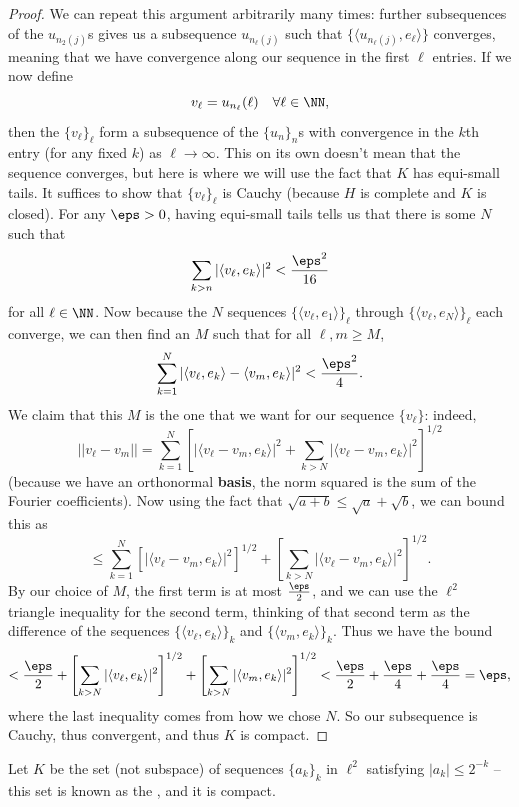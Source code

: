 \begin{proof}
We can repeat this argument arbitrarily many times: further subsequences of the $u_{n_2(j)}$s gives us a subsequence $u_{n_\ell(j)}$ such that $\{\langle u_{n_\ell(j)}, e_\ell \rangle\}$ converges, meaning that we have convergence along our sequence in the first $\ell$ entries. If we now define
\[
    v_\ell = u_{n_\ell}(\ell) \quad \forall \ell \in \NN,
\]  
then the $\{v_\ell\}_\ell$ form a subsequence of the $\{u_n\}_n$s with convergence in the $k$th entry (for any fixed $k$) as $\ell \to \infty$. This on its own doesn't mean that the sequence converges, but here is where we will use the fact that $K$ has equi-small tails. It suffices to show that $\{v_\ell\}_{\ell}$ is Cauchy (because $H$ is complete and $K$ is closed). For any $\eps > 0$, having equi-small tails tells us that there is some $N$ such that 
\[
    \sum_{k > n} |\langle v_\ell, e_k \rangle|^2 < \frac{\eps^2}{16}
\]
for all $\ell \in \NN$. Now because the $N$ sequences $\{\langle v_\ell, e_1 \rangle\}_\ell$ through $\{\langle v_\ell, e_N \rangle\}_\ell$ each converge, we can then find an $M$ such that for all $\ell, m \ge M$, 
\[
    \sum_{k=1}^N |\langle v_\ell, e_k \rangle - \langle v_m, e_k \rangle|^2 < \frac{\eps^2}{4}.
\]
We claim that this $M$ is the one that we want for our sequence $\{v_\ell\}$: indeed, 
\[
    ||v_\ell - v_m|| = \sum_{k=1}^N \left[|\langle v_\ell - v_m, e_k \rangle|^2 + \sum_{k>N} |\langle v_\ell - v_m, e_k \rangle|^2\right]^{1/2}
\]
(because we have an orthonormal \textbf{basis}, the norm squared is the sum of the Fourier coefficients). Now using the fact that $\sqrt{a+b} \le \sqrt{a} + \sqrt{b}$, we can bound this as 
\[
    \le \sum_{k=1}^N \left[|\langle v_\ell - v_m, e_k \rangle|^2\right]^{1/2} + \left[\sum_{k>N} |\langle v_\ell - v_m, e_k \rangle|^2\right]^{1/2}.
\]
By our choice of $M$, the first term is at most $\frac{\eps}{2}$, and we can use the $\ell^2$ triangle inequality for the second term, thinking of that second term as the difference of the sequences $\{\langle v_\ell, e_k \rangle\}_k$ and $\{\langle v_m, e_k \rangle\}_k$. Thus we have the bound
\[
    < \frac{\eps}{2} + \left[\sum_{k>N} |\langle v_\ell, e_k \rangle|^2\right]^{1/2} + \left[\sum_{k>N} |\langle v_m, e_k \rangle|^2\right]^{1/2} < \frac{\eps}{2} + \frac{\eps}{4} + \frac{\eps}{4} = \eps,
\]
where the last inequality comes from how we chose $N$. So our subsequence is Cauchy, thus convergent, and thus $K$ is compact. 
\end{proof}

\begin{example}
Let $K$ be the set (not subspace) of sequences $\{a_k\}_k$ in $\ell^2$ satisfying $|a_k| \le 2^{-k}$ -- this set is known as the , and it is compact. 
\end{example}

